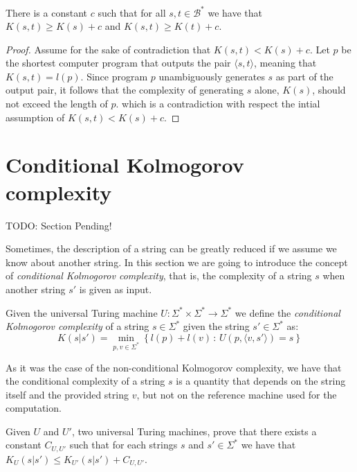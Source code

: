 \begin{proposition}
\label{prop:excess_kolmogorov}
There is a constant $c$ such that for all $s, t \in\mathcal{B}^{\ast}$ we have that $K(s, t) \geq K(s) + c$ and $K(s, t) \geq K(t) + c$.
\end{proposition}
\begin{proof}
Assume for the sake of contradiction that $K(s, t) < K(s) + c$. Let $p$ be the shortest computer program that outputs the pair $\langle s, t \rangle$, meaning that $K(s, t) = l(p)$. Since program $p$ unambiguously generates $s$ as part of the output pair, it follows that the complexity of generating $s$ alone, $K(s)$, should not exceed the length of $p$. which is a contradiction with respect the intial assumption of $K(s, t) < K(s) + c$. 
\end{proof}


%
%

\section{Conditional Kolmogorov complexity}

{\color{red} TODO: Section Pending!}

Sometimes, the description of a string can be greatly reduced if we assume we know about another string. In this section we are going to introduce the concept of \emph{conditional Kolmogorov complexity}, that is, the complexity of a string $s$ when another string $s'$ is given as input.

\begin{definition}
Given the universal Turing machine $U:\Sigma^{\ast}\times\Sigma^{\ast}\rightarrow\Sigma^{\ast}$ we define the \emph{conditional Kolmogorov complexity} of a string $s\in\Sigma^{\ast}$ given the string $s'\in\Sigma^{\ast}$ as:
\[
K(s|s')=\min_{p,v\in\Sigma^{\ast}}\left\{l(p) + l(v)\,:\, U(p,\langle v, s' \rangle)=s\right\}
\]
\end{definition}

As it was the case of the non-conditional Kolmogorov complexity, we have that the conditional complexity of a string $s$ is a quantity that depends on the string itself and the provided string $v$, but not on the reference machine used for the computation.

\begin{exercise}
Given $U$ and $U'$, two universal Turing machines, prove that there exists a constant $C_{U, U'}$ such that for each strings $s$ and $s' \in \Sigma^{\ast}$ we have that $K_{U}(s|s') \leq K_{U'}(s|s') + C_{U, U'}$.
\end{exercise}


